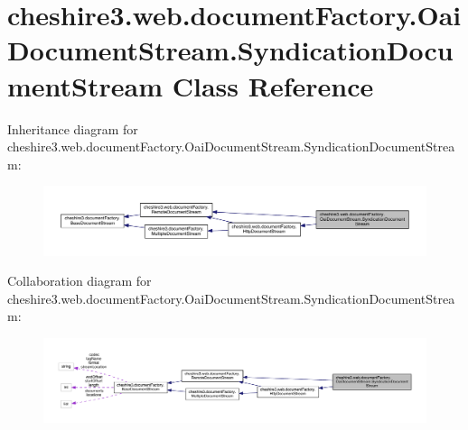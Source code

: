\hypertarget{classcheshire3_1_1web_1_1document_factory_1_1_oai_document_stream_1_1_syndication_document_stream}{\section{cheshire3.\-web.\-document\-Factory.\-Oai\-Document\-Stream.\-Syndication\-Document\-Stream Class Reference}
\label{classcheshire3_1_1web_1_1document_factory_1_1_oai_document_stream_1_1_syndication_document_stream}
}


Inheritance diagram for cheshire3.\-web.\-document\-Factory.\-Oai\-Document\-Stream.\-Syndication\-Document\-Stream\-:
\nopagebreak
\begin{figure}[H]
\begin{center}
\leavevmode
\includegraphics[width=350pt]{classcheshire3_1_1web_1_1document_factory_1_1_oai_document_stream_1_1_syndication_document_stream__inherit__graph}
\end{center}
\end{figure}


Collaboration diagram for cheshire3.\-web.\-document\-Factory.\-Oai\-Document\-Stream.\-Syndication\-Document\-Stream\-:
\nopagebreak
\begin{figure}[H]
\begin{center}
\leavevmode
\includegraphics[width=350pt]{classcheshire3_1_1web_1_1document_factory_1_1_oai_document_stream_1_1_syndication_document_stream__coll__graph}
\end{center}
\end{figure}
